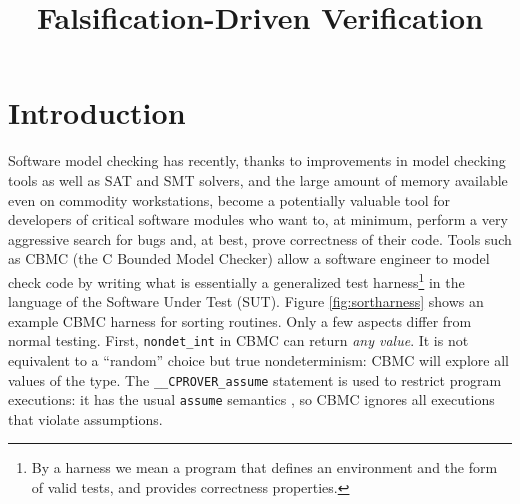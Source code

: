 \documentclass[conference]{IEEEtran}
\begin{document}
\title{Falsification-Driven Verification}

\author{
\and
{}
}


\maketitle


\begin{abstract}

\end{abstract}

\IEEEpeerreviewmaketitle



\section{Introduction}

Software model checking \cite{ModelChecking} has recently, thanks to
improvements in model checking tools as well as SAT and SMT solvers,
and the large amount of memory available even on commodity
workstations, become a potentially valuable tool for developers of
critical software modules who want to, at minimum, perform a very
aggressive search for bugs and, at best, prove correctness of their
code.  Tools such as CBMC \cite{CBMCp} (the C Bounded Model Checker)
allow a software engineer to model check code by writing what is
essentially a generalized test harness\footnote{By a harness we mean a
  program that defines an environment and the form of valid tests, and provides correctness
  properties.} in the language of the
Software Under Test (SUT).  Figure \ref{fig:sortharness} shows an
example CBMC harness for sorting routines.  Only a few aspects differ
from normal testing.  First, {\tt nondet\_int} in CBMC can return
\emph{any value}.  It is not equivalent to a ``random''
choice but true nondeterminism: CBMC will explore all values of the type.
The {\tt \_\_CPROVER\_assume} statement is used to restrict
program executions: it has the usual {\tt assume} semantics
\cite{EWD:Discipline,exploit}, so CBMC ignores all executions that
violate assumptions.
\end{document}
